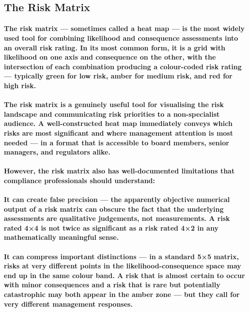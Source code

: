 \subsection{The Risk Matrix}
\paragraph{The risk matrix — sometimes called a heat map — is the most widely used tool for combining likelihood and consequence assessments into an overall risk rating. In its most common form, it is a grid with likelihood on one axis and consequence on the other, with the intersection of each combination producing a colour-coded risk rating — typically green for low risk, amber for medium risk, and red for high risk.}
\paragraph{The risk matrix is a genuinely useful tool for visualising the risk landscape and communicating risk priorities to a non-specialist audience. A well-constructed heat map immediately conveys which risks are most significant and where management attention is most needed — in a format that is accessible to board members, senior managers, and regulators alike.}
\paragraph{However, the risk matrix also has well-documented limitations that compliance professionals should understand:}
\paragraph{\textbf{It can create false precision} — the apparently objective numerical output of a risk matrix can obscure the fact that the underlying assessments are qualitative judgements, not measurements. A risk rated 4×4 is not twice as significant as a risk rated 4×2 in any mathematically meaningful sense.}
\paragraph{\textbf{It can compress important distinctions} — in a standard 5×5 matrix, risks at very different points in the likelihood-consequence space may end up in the same colour band. A risk that is almost certain to occur with minor consequences and a risk that is rare but potentially catastrophic may both appear in the amber zone — but they call for very different management responses.}
